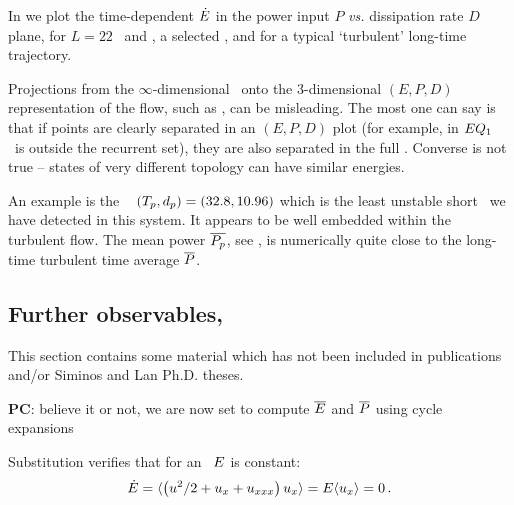                                                     \toCB
In  we plot %
the time-dependent
$\dot{E}$ in the power input $P$ {\em vs.}
dissipation rate $D$ plane, for $L=22$ \eqva\ and \reqva,
a selected \rpo, and for a typical `turbulent' long-time
trajectory.

Projections from the $\infty$-dimensional \statesp\ onto the 3-dimensional
$(E,P,D)$ representation of the flow, such as
, can be misleading.
The most one can say is that if points are clearly separated in an
$(E,P,D)$ plot (for example, in 
$EQ_{1}$ \eqv\ is outside the recurrent set), they are also separated
in the full \statesp.  Converse is not true -- states of
very different topology can have similar energies.

An example is the \rpo\  $({T_{p}},d_p) = (32.8,10.96)$
which {is the least unstable short \rpo\ we have detected in this system.
It} appears to be well embedded within the turbulent flow. The mean power
$\overline{P_p}$,
see ,
is numerically quite close to the long-time turbulent time average
$\overline{P}$.

\subsection{Further observables, \KS}
\label{sec:moreObs}

                                                    \toCB
This section contains some material which has not been included in
publications and/or Siminos and Lan Ph.D. theses.

{\bf PC}: believe it or not, we are now set to compute
    $\overline{E}$ and $\overline{P}$
    using cycle expansions

Substitution %
verifies that for an \eqv\ $E$ is constant:
\[
   \dot{E} =
\langle { \left({u^2}/{2} + u_{x} + u_{xxx} \right) u_x} \rangle
    = E \langle { u_x } \rangle=0
    \,.
\]


